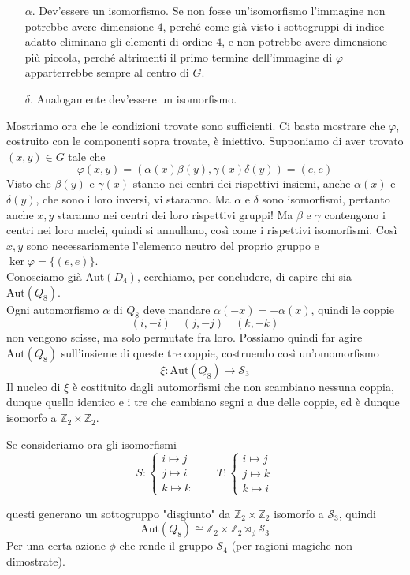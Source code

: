 \documentclass[a4paper]{article}
\theoremstyle{remark}
\theoremstyle{definition}
\newcommand{\Aut}[1]{\mathrm{Aut}\left( #1 \right)}
\newcommand{\Z}{\mathbb{Z}}
\begin{document}
\begin{multicols}{2}
\begin{itemize}
	 \item [$ \alpha $.] Dev'essere un isomorfismo. Se non fosse un'isomorfismo l'immagine non potrebbe avere dimensione $ 4 $, perché come già visto i sottogruppi di indice adatto eliminano gli elementi di ordine $ 4 $, e non potrebbe avere dimensione più piccola, perché altrimenti il primo termine dell'immagine di $ \varphi $ apparterrebbe sempre al centro di $ G $.
	 
	 \item [$ \delta $.] Analogamente dev'essere un isomorfismo. 
	\end{itemize}
Mostriamo ora che le condizioni trovate sono sufficienti. Ci basta mostrare che $ \varphi $, costruito con le componenti sopra trovate, è iniettivo. Supponiamo di aver trovato $ (x, y) \in G $ tale che
\[ \varphi(x, y) = (\alpha(x)\beta(y), \gamma(x)\delta(y)) = (e, e) \]
Visto che $ \beta(y) $ e $ \gamma(x) $ stanno nei centri dei rispettivi insiemi, anche $ \alpha(x) $ e $ \delta(y) $, che sono i loro inversi, vi staranno. Ma $ \alpha $ e $ \delta $ sono isomorfismi, pertanto anche $ x, y $ staranno nei centri dei loro rispettivi gruppi! Ma $ \beta $ e $ \gamma $ contengono i centri nei loro nuclei, quindi si annullano, così come i rispettivi isomorfismi. Così $ x, y $ sono necessariamente l'elemento neutro del proprio gruppo e $ \ker\varphi = \{(e, e)\} $. \\

Conosciamo già $ \Aut{D_4} $, cerchiamo, per concludere, di capire chi sia{\tiny } $ \Aut{Q_8} $. \\

Ogni automorfismo $ \alpha $ di $ Q_8 $ deve mandare $ \alpha(-x) = -\alpha(x) $, quindi le coppie 
\[ (i, -i) \quad (j, -j) \quad (k, -k) \]
non vengono scisse, ma solo permutate fra loro. Possiamo quindi far agire $ \Aut{Q_8} $ sull'insieme di queste tre coppie, costruendo così un'omomorfismo
\[ \xi : \Aut{Q_8} \to \mathcal{S}_3 \]
Il nucleo di $ \xi $ è costituito dagli automorfismi che non scambiano nessuna coppia, dunque quello identico e i tre che cambiano segni a due delle coppie, ed è dunque isomorfo a $ \Z_2 \times \Z_2 $.

Se consideriamo ora gli isomorfismi
\[ S: \begin{cases}
i \mapsto j \\ j \mapsto i \\ k \mapsto k
\end{cases}
\qquad T: \begin{cases}
i \mapsto j\\
j \mapsto k\\
k \mapsto i
\end{cases} \]


questi generano un sottogruppo "disgiunto" da $ \Z_2 \times \Z_2 $ isomorfo a $ \mathcal{S}_3 $, quindi
\[ \Aut{Q_8} \cong \Z_2 \times \Z_2 \rtimes_\phi \mathcal{S}_3 \] Per una certa azione $ \phi $ che rende il gruppo $ \mathcal{S}_4 $ (per ragioni magiche non dimostrate).




\end{multicols}
\end{document}
